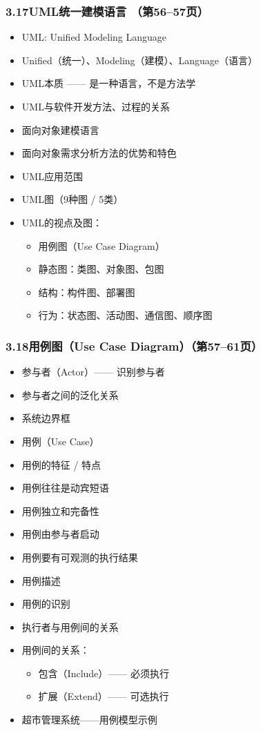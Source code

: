 \documentclass[12pt,a4paper]{ctexart}
\begin{document}
\subsubsection{3.17\quad UML统一建模语言 \hfill（第56--57页）}
\begin{itemize}
    \item UML: Unified Modeling Language
    \item Unified（统一）、Modeling（建模）、Language（语言）
    \item UML本质 —— 是一种语言，不是方法学
    \item UML与软件开发方法、过程的关系
    \item 面向对象建模语言
    \item 面向对象需求分析方法的优势和特色
    \item UML应用范围
    \item UML图（9种图 / 5类）
    \item UML的视点及图：
    \begin{itemize}
        \item 用例图（Use Case Diagram）
        \item 静态图：类图、对象图、包图
        \item 结构：构件图、部署图
        \item 行为：状态图、活动图、通信图、顺序图
    \end{itemize}
\end{itemize}

\subsubsection{3.18\quad 用例图（Use Case Diagram）\hfill（第57--61页）}
\begin{itemize}
    \item 参与者（Actor）—— 识别参与者
    \item 参与者之间的泛化关系
    \item 系统边界框
    \item 用例（Use Case）
    \item 用例的特征 / 特点
    \item 用例往往是动宾短语
    \item 用例独立和完备性
    \item 用例由参与者启动
    \item 用例要有可观测的执行结果
    \item 用例描述
    \item 用例的识别
    \item 执行者与用例间的关系
    \item 用例间的关系：
    \begin{itemize}
        \item 包含（Include）—— 必须执行
        \item 扩展（Extend）—— 可选执行
    \end{itemize}
    \item 超市管理系统——用例模型示例
\end{itemize}
\end{document}
